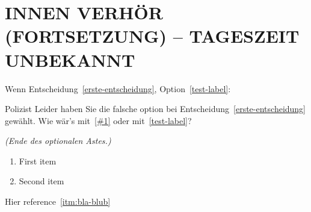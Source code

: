 \documentclass[12pt]{article}
\newenvironment{scene}[4][\unskip]{
    \textbf{\uppercase{#1}}


    \section{\uppercase{#2 #3 -- #4}}\label{sec:scene-#3}
    }{}
\newenvironment{conditional}[2]{Wenn Entscheidung~\ref{#1}, Option~\ref{#2}:}{\textit{(Ende des optionalen Astes.)}}
\begin{document}
\begin{scene}{innen}{Verhör (Fortsetzung)}{Tageszeit unbekannt}
        \begin{conditional}{erste-entscheidung}{test-label}
            \begin{dialog}{Polizist}
                Leider haben Sie die falsche option bei Entscheidung~\ref{erste-entscheidung} gewählt.
                Wie wär's mit~\ref{#1} oder mit~\ref{test-label}?
            \end{dialog}
        \end{conditional}
    \end{scene}

    \begin{enumerate}
        \item First item
        \item \label{itm:bla-blub} Second item
    \end{enumerate}

    Hier reference~\ref{itm:bla-blub}
\end{document}
